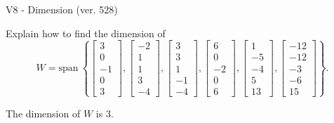 \begin{exercise}
  \begin{exerciseTitle}V8 - Dimension (ver. 528)\end{exerciseTitle}
  \begin{exerciseStatement}
    Explain how to find the dimension of 
\[W=\mathrm{span}\ \left\{\left[\begin{array}{r}
3 \\
0 \\
-1 \\
0 \\
3
\end{array}\right] , \left[\begin{array}{r}
-2 \\
1 \\
1 \\
3 \\
-4
\end{array}\right] , \left[\begin{array}{r}
3 \\
3 \\
1 \\
-1 \\
-4
\end{array}\right] , \left[\begin{array}{r}
6 \\
0 \\
-2 \\
0 \\
6
\end{array}\right] , \left[\begin{array}{r}
1 \\
-5 \\
-4 \\
5 \\
13
\end{array}\right] , \left[\begin{array}{r}
-12 \\
-12 \\
-3 \\
-6 \\
15
\end{array}\right]\right\}.\]



  \end{exerciseStatement}
  \begin{exerciseAnswer}
   The dimension of \(W\) is  \(3\).
  


  \end{exerciseAnswer}
\end{exercise}